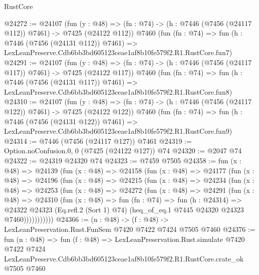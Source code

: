 \begin{lexlean}{RustCore}
\begin{coremodule}
@24272 := @24107
    (fun (y : @48) => (fn : @74) -> (h : @7446 (@7456 (@24117 @112)) @7461) -> @7425 (@24122 @112))
    @7460
    (fun (fn : @74) =>
    fun (h : @7446 (@7456 (@24131 @112)) @7461) =>
    LexLeanPreserve.Cdb6bb3bd605123ceae1af8b10fe579f2.R1.RustCore.fun7)
@24291 := @24107
    (fun (y : @48) => (fn : @74) -> (h : @7446 (@7456 (@24117 @117)) @7461) -> @7425 (@24122 @117))
    @7460
    (fun (fn : @74) =>
    fun (h : @7446 (@7456 (@24131 @117)) @7461) =>
    LexLeanPreserve.Cdb6bb3bd605123ceae1af8b10fe579f2.R1.RustCore.fun8)
@24310 := @24107
    (fun (y : @48) => (fn : @74) -> (h : @7446 (@7456 (@24117 @122)) @7461) -> @7425 (@24122 @122))
    @7460
    (fun (fn : @74) =>
    fun (h : @7446 (@7456 (@24131 @122)) @7461) =>
    LexLeanPreserve.Cdb6bb3bd605123ceae1af8b10fe579f2.R1.RustCore.fun9)
@24314 := @7446 (@7456 (@24117 @127)) @7461
@24319 := Option.noConfusion.{0, 0} (@7425 (@24122 @127)) @74
@24320 := @2047 @74
@24322 := @24319 @24320 @74
@24323 := @7459 @7505
@24358 := fun (x : @48) =>
  @24139
    (fun (x : @48) =>
    @24158
      (fun (x : @48) =>
      @24177
        (fun (x : @48) =>
        @24196
          (fun (x : @48) =>
          @24215
            (fun (x : @48) =>
            @24234
              (fun (x : @48) =>
              @24253
                (fun (x : @48) =>
                @24272
                  (fun (x : @48) =>
                  @24291
                    (fun (x : @48) =>
                    @24310
                      (fun (x : @48) =>
                      fun (fn : @74) =>
                      fun (h : @24314) =>
                      @24322
                        @24323
                        (Eq.refl.{2} (Sort 1) @74)
                        (heq_of_eq.{1} @7445 @24320 @24323 @7460)))))))))))
@24366 := (n : @48) -> (f : @48) -> LexLeanPreservation.Rust.FunSem @7420 @7422 @7424 @7505 @7460
@24376 := fun (n : @48) =>
  fun (f : @48) =>
  LexLeanPreservation.Rust.simulate
    @7420
    @7422
    @7424
    LexLeanPreserve.Cdb6bb3bd605123ceae1af8b10fe579f2.R1.RustCore.crate_ok
    @7505
    @7460
\end{coremodule}
\end{lexlean}

